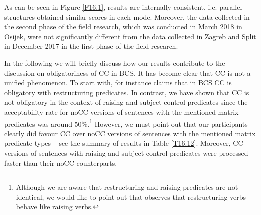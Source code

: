 As can be seen in Figure \ref{F16.1}, results are internally consistent, i.e. parallel structures obtained similar scores in each mode. Moreover, the data collected in the second phase of the field research, which was conducted in March 2018 in Osijek, were not significantly different from the data collected in Zagreb and Split in December 2017 in the first phase of the field research. 

In the following we will briefly discuss how our results contribute to the discussion on obligatoriness of CC in BCS. It has become clear that CC is not a unified phenomenon. To start with, \citet[][]{Aljovic05} for instance claims that in BCS CC is obligatory with restructuring predicates. In contrast, we have shown that CC is not obligatory in the context of raising and subject control predicates since the acceptability rate for noCC versions of sentences with the mentioned matrix predicates was around 50\%.\footnote{Although we are aware that restructuring and raising predicates are not identical, we would like to point out that \citet[][198--204]{Stjepanovic04} observes that restructuring verbs behave like raising verbs.} However, we must point out that our participants clearly did favour CC over noCC versions of sentences with the mentioned matrix predicate types – see the summary of results in Table \ref{T16.12}. Moreover, CC versions of sentences with raising and subject control predicates were processed faster than their noCC counterparts. 

